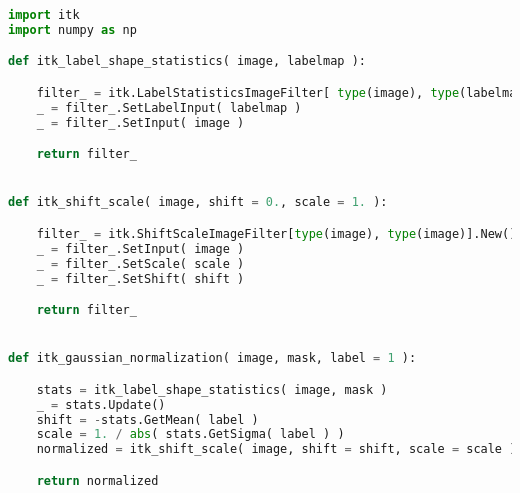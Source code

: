 \documentclass{standalone}
\begin{document}
\lstset{style=python}
	\begin{lstlisting}[language=python, caption = Normalization functions, label=normalization]
import itk
import numpy as np

def itk_label_shape_statistics( image, labelmap ):

    filter_ = itk.LabelStatisticsImageFilter[ type(image), type(labelmap) ].New()
    _ = filter_.SetLabelInput( labelmap )
    _ = filter_.SetInput( image )

    return filter_


def itk_shift_scale( image, shift = 0., scale = 1. ):

    filter_ = itk.ShiftScaleImageFilter[type(image), type(image)].New()
    _ = filter_.SetInput( image )
    _ = filter_.SetScale( scale )
    _ = filter_.SetShift( shift )

    return filter_


def itk_gaussian_normalization( image, mask, label = 1 ):

    stats = itk_label_shape_statistics( image, mask )
    _ = stats.Update()
    shift = -stats.GetMean( label )
    scale = 1. / abs( stats.GetSigma( label ) )
    normalized = itk_shift_scale( image, shift = shift, scale = scale )

    return normalized


\end{lstlisting}
\end{document}
